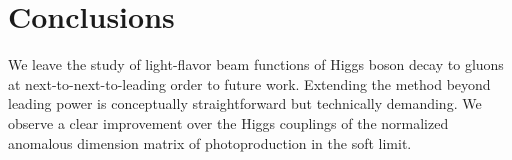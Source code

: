 \section{Conclusions}\label{sec:conclusions}

We leave the study of light-flavor beam functions of Higgs boson decay
to gluons at next-to-next-to-leading order to future work. Extending the
method beyond leading power is conceptually straightforward but
technically demanding. We observe a clear improvement over the Higgs
couplings of the normalized anomalous dimension matrix of
photoproduction in the soft limit.

